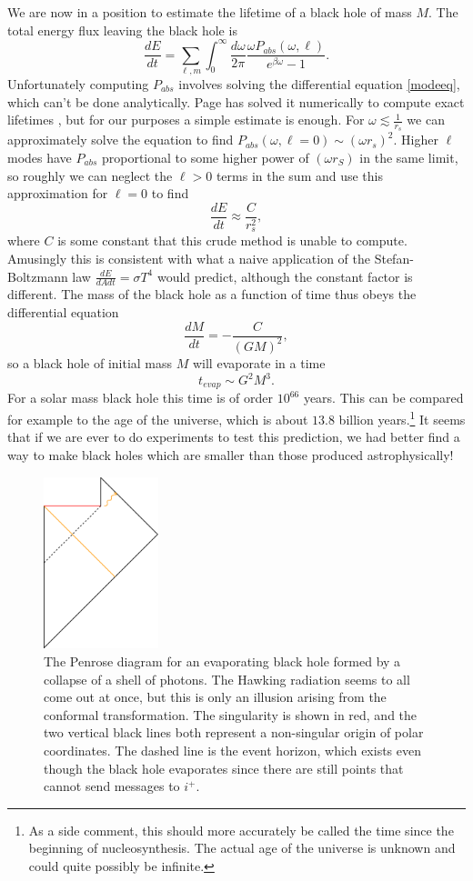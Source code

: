 \documentclass[12pt]{article}
\newcommand{\be}{\begin{equation}}
\newcommand{\ee}{\end{equation}}
\begin{document}
We are now in a position to estimate the lifetime of a black hole of mass $M$.  The total energy flux leaving the black hole is
\be
\frac{dE}{dt}=\sum_{\ell,m}\int_0^\infty \frac{d\omega}{2\pi}\frac{\omega P_{abs}(\omega,\ell)}{e^{\beta \omega}-1}.
\ee   
Unfortunately computing $P_{abs}$ involves solving the differential equation \eqref{modeeq}, which can't be done analytically.  Page has solved it numerically to compute exact lifetimes \cite{Page:1976df}, but for our purposes a simple estimate is enough.  For $\omega \lesssim \frac{1}{r_s}$ we can approximately solve the equation to find $P_{abs}(\omega,\ell=0)\sim (\omega r_s)^2$.  Higher $\ell$ modes have $P_{abs}$ proportional to some higher power of $(\omega r_S)$ in the same limit, so roughly we can neglect the $\ell>0$ terms in the sum and use this approximation for $\ell=0$ to find
\be
\frac{dE}{dt}\approx \frac{C}{r_s^2},
\ee
where $C$ is some constant that this crude method is unable to compute.  Amusingly this is consistent with what a naive application of the Stefan-Boltzmann law $\frac{dE}{dA dt}=\sigma T^4$ would predict, although the constant factor is different.  The mass of the black hole as a function of time thus obeys the differential equation
\be
\frac{dM}{dt}=-\frac{C}{(GM)^2},
\ee
so a black hole of initial mass $M$ will evaporate in a time
\be
t_{evap}\sim G^2 M^3.
\ee
For a solar mass black hole this time is of order $10^{66}$ years.  This can be compared for example to the age of the universe, which is about $13.8$ billion years.\footnote{As a side comment, this should more accurately be called the time since the beginning of nucleosynthesis.  The actual age of the universe is unknown and could quite possibly be infinite.}  It seems that if we are ever to do experiments to test this prediction, we had better find a way to make black holes which are smaller than those produced astrophysically!
\begin{figure}
\begin{center}
\includegraphics[height=5cm]{evappen.pdf}
\caption{The Penrose diagram for an evaporating black hole formed by a collapse of a shell of photons.  The Hawking radiation seems to all come out at once, but this is only an illusion arising from the conformal transformation.  The singularity is shown in red, and the two vertical black lines both represent a non-singular origin of polar coordinates.  The dashed line is the event horizon, which exists even though the black hole evaporates since there are still points that cannot send messages to $i^+$.}\label{evappen}
\end{center}
\end{figure}
\end{document}
